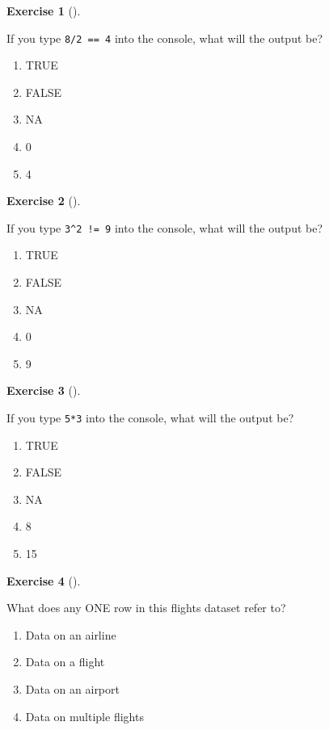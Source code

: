 \documentclass[
  letterpaper,
  DIV=11,
  numbers=noendperiod]{scrreprt}
\providecommand{\tightlist}{%
  \setlength{\itemsep}{0pt}\setlength{\parskip}{0pt}}\usepackage{longtable,booktabs,array}
\theoremstyle{definition}
\newtheorem{exercise}{Exercise}[chapter]
\theoremstyle{remark}
\begin{document}
\leavevmode{}%
\begin{exercise}[]\label{exr-ch01-c04}

If you type \texttt{8/2\ ==\ 4} into the console, what will the output
be?

\begin{enumerate}
\def\labelenumi{\alph{enumi})}
\tightlist
\item
  TRUE
\item
  FALSE
\item
  NA
\item
  0
\item
  4
\end{enumerate}

\end{exercise}

\leavevmode{}%
\begin{exercise}[]\label{exr-ch01-c05}

If you type \texttt{3\^{}2\ !=\ 9} into the console, what will the
output be?

\begin{enumerate}
\def\labelenumi{\alph{enumi})}
\tightlist
\item
  TRUE
\item
  FALSE
\item
  NA
\item
  0
\item
  9
\end{enumerate}

\end{exercise}

\leavevmode{}%
\begin{exercise}[]\label{exr-ch01-c06}

If you type \texttt{5*3} into the console, what will the output be?

\begin{enumerate}
\def\labelenumi{\alph{enumi})}
\tightlist
\item
  TRUE
\item
  FALSE
\item
  NA
\item
  8
\item
  15
\end{enumerate}

\end{exercise}

\leavevmode{}%
\begin{exercise}[]\label{exr-ch01-c07}

What does any ONE row in this flights dataset refer to?

\begin{enumerate}
\def\labelenumi{\alph{enumi})}
\tightlist
\item
  Data on an airline
\item
  Data on a flight
\item
  Data on an airport
\item
  Data on multiple flights
\end{enumerate}

\end{exercise}
\end{document}
